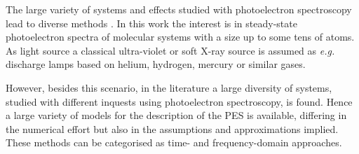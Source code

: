 The large variety of systems and effects studied with photoelectron spectroscopy lead to diverse methods \cite{PESbook, x-ray}.
In this work the interest is in steady-state photoelectron spectra of molecular systems with a size up to some tens of atoms.
As light source a classical ultra-violet or soft X-ray source is assumed as \textit{e.g.} discharge lamps based on helium, hydrogen, mercury or similar gases.

However, besides this scenario, in the literature a large diversity of systems, studied with different inquests using photoelectron spectroscopy, is found.
Hence a large variety of models for the description of the PES is available, differing in the numerical effort but also in the assumptions and approximations implied.
These methods can be categorised as time- and frequency-domain approaches.
